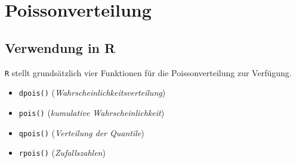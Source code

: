 \clearpage
\newpage
\section{Poissonverteilung}

\subsection{Verwendung in R}
\lstinline{R} stellt grundsätzlich vier Funktionen für die 
Poissonverteilung zur Verfügung. 
\begin{itemize}
	\item \lstinline{dpois()} \hfill{} 
		(\emph{Wahrscheinlichkeitsverteilung})
	\item \lstinline{pois()} \hfill{}
		(\emph{kumulative Wahrscheinlichkeit})
	\item \lstinline{qpois()} \hfill{}
		(\emph{Verteilung der Quantile})
	\item \lstinline{rpois()} \hfill{}
		(\emph{Zufallszahlen})
\end{itemize}





